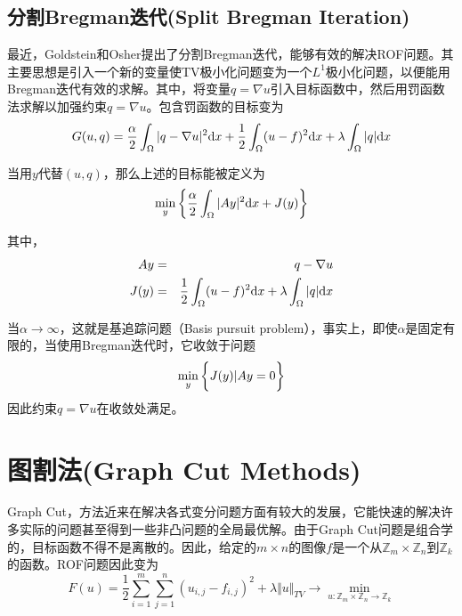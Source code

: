 \documentclass[a4paper,12pt]{article}
\begin{document}
\subsection{分割Bregman迭代(Split Bregman Iteration)}

最近，Goldstein和Osher\cite{Goldstein:2009sp}提出了分割Bregman迭代，能够有效的解决ROF问题。其主要思想是引入一个新的变量使TV极小化问题变为一个$L^1$极小化问题，以便能用Bregman迭代有效的求解。其中，将变量$q=\nabla u$引入目标函数中，然后用罚函数法求解以加强约束$q=\nabla u$。包含罚函数的目标变为
\begin{displaymath}
G(u,q)=\frac{\alpha}{2}\int_{\Omega}|q-\nabla u|^2\mathrm{d} x+\frac{1}{2}\int_{\Omega}(u-f)^2\mathrm{d} x+\lambda\int_{\Omega}|q|\mathrm{d} x
\end{displaymath}

当用$y$代替$(u,q)$，那么上述的目标能被定义为
\begin{displaymath}
\min_y\bigg{\{}\frac{\alpha}{2}\int_{\Omega}|Ay|^2\mathrm{d} x+J(y)\bigg{\}}
\end{displaymath}

其中，
\begin{eqnarray*}
Ay&=&q-\nabla u\\
J(y)&=&\frac{1}{2}\int_{\Omega}(u-f)^2\mathrm{d} x+\lambda\int_{\Omega}|q| \mathrm{d} x
\end{eqnarray*}

当$\alpha\rightarrow\infty$，这就是基追踪问题（Basis pursuit problem），事实上，即使$\alpha$是固定有限的，当使用Bregman迭代时，它收敛于问题
\begin{displaymath}
\min_y\bigg{\{}J(y)|Ay=0\bigg{\}}
\end{displaymath}
因此约束$q=\nabla u$在收敛处满足。

\section{图割法(Graph Cut Methods)}

Graph Cut\cite{Chambolle:1997gr}，\cite{Darbon:2006gr}方法近来在解决各式变分问题方面有较大的发展，它能快速的解决许多实际的问题甚至得到一些非凸问题的全局最优解。由于Graph Cut问题是组合学的，目标函数不得不是离散的。因此，给定的$m\times n$的图像$f$是一个从$\mathbb{Z}_m\times\mathbb{Z}_n$到$\mathbb{Z}_k$的函数。ROF问题因此变为
\begin{displaymath}
F(u)=\frac{1}{2}\sum_{i=1}^m\sum_{j=1}^n(u_{i,j}-f_{i,j})^2+\lambda\Vert u\Vert_{TV}\rightarrow\min_{u:\mathbb{Z}_m\times\mathbb{Z}_n\rightarrow\mathbb{Z}_k}
\end{displaymath}
\end{document}

